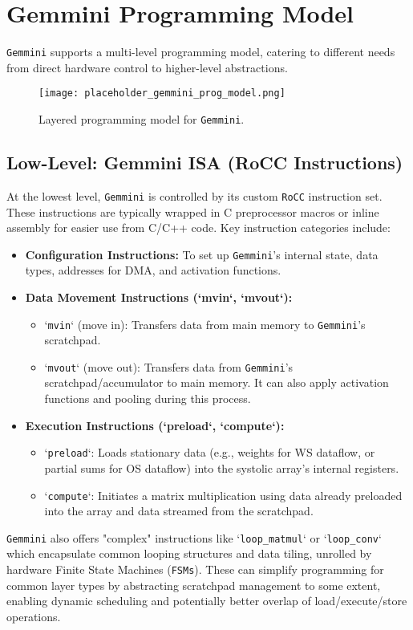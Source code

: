 \section{Gemmini Programming Model}
\label{sec:gemmini_programming_model}
\texttt{Gemmini} supports a multi-level programming model, catering to different needs from direct hardware control to higher-level abstractions.

\begin{figure}[h!]
    \centering
    \texttt{[image: placeholder\_gemmini\_prog\_model.png]}
    \caption{Layered programming model for \texttt{Gemmini}.}
    \label{fig:gemmini_prog_model}
\end{figure}

\subsection{Low-Level: Gemmini ISA (RoCC Instructions)}
\label{subsec:gemmini_low_level_isa}
At the lowest level, \texttt{Gemmini} is controlled by its custom \texttt{RoCC} instruction set. These instructions are typically wrapped in C preprocessor macros or inline assembly for easier use from C/C++ code. Key instruction categories include:
\begin{itemize}
    \item \textbf{Configuration Instructions:} To set up \texttt{Gemmini}'s internal state, data types, addresses for DMA, and activation functions.
    \item \textbf{Data Movement Instructions (`mvin`, `mvout`):}
        \begin{itemize}
            \item `\texttt{mvin}` (move in): Transfers data from main memory to \texttt{Gemmini}'s scratchpad.
            \item `\texttt{mvout}` (move out): Transfers data from \texttt{Gemmini}'s scratchpad/accumulator to main memory. It can also apply activation functions and pooling during this process.
        \end{itemize}
    \item \textbf{Execution Instructions (`preload`, `compute`):}
        \begin{itemize}
            \item `\texttt{preload}`: Loads stationary data (e.g., weights for WS dataflow, or partial sums for OS dataflow) into the systolic array's internal registers.
            \item `\texttt{compute}`: Initiates a matrix multiplication using data already preloaded into the array and data streamed from the scratchpad.
        \end{itemize}
\end{itemize}
\texttt{Gemmini} also offers "complex" instructions like `\texttt{loop\_matmul}` or `\texttt{loop\_conv}` which encapsulate common looping structures and data tiling, unrolled by hardware Finite State Machines (\texttt{FSMs}). These can simplify programming for common layer types by abstracting scratchpad management to some extent, enabling dynamic scheduling and potentially better overlap of load/execute/store operations.

